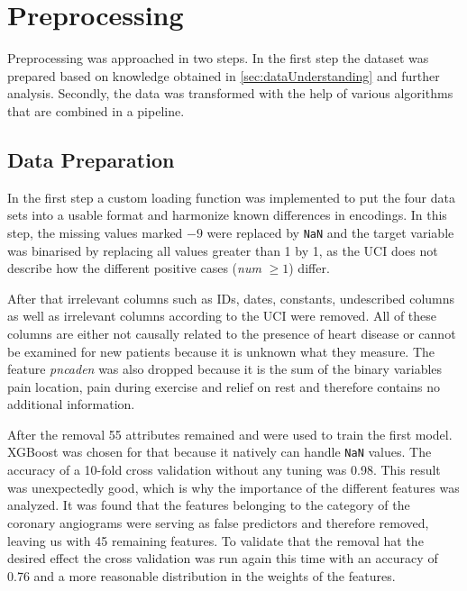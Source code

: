 




\section{Preprocessing} \label{sec:preprocessing}

Preprocessing was approached in two steps. In the first step the dataset was prepared based on knowledge obtained in \cref{sec:dataUnderstanding} and further analysis. 
Secondly, the data was transformed with the help of various algorithms that are combined in a pipeline. 

\subsection{Data Preparation}
In the first step a custom loading function was implemented to put the four data sets into a usable format and harmonize known differences in encodings. In this step, the missing values marked \texttt{$-9$} were replaced by \texttt{NaN} and the target variable was binarised by replacing all values greater than 1 by 1, as the UCI does not describe how the different positive cases (\textit{num} $\geq 1$) differ.

After that irrelevant columns such as IDs, dates, constants, undescribed columns as well as irrelevant columns according to the UCI were removed. All of these columns are either not causally related to the presence of heart disease or cannot be examined for new patients because it is unknown what they measure. The feature \textit{pncaden} was also dropped because it is the sum of the binary variables  pain location, pain during exercise and relief on rest and therefore contains no additional information. 

After the removal 55 attributes remained and were used to train the first model. XGBoost was chosen for that because it natively can handle \texttt{NaN} values. The accuracy of a 10-fold cross validation without any tuning was 0.98. This result was unexpectedly good, which is why   the importance of the different features was analyzed. It was found that the features belonging to the category of the coronary angiograms were serving as false predictors and therefore removed, leaving us with 45 remaining features. To validate that the removal hat the desired effect the cross validation was run again this time with an accuracy of 0.76 and a more reasonable distribution in the weights of the features.   

